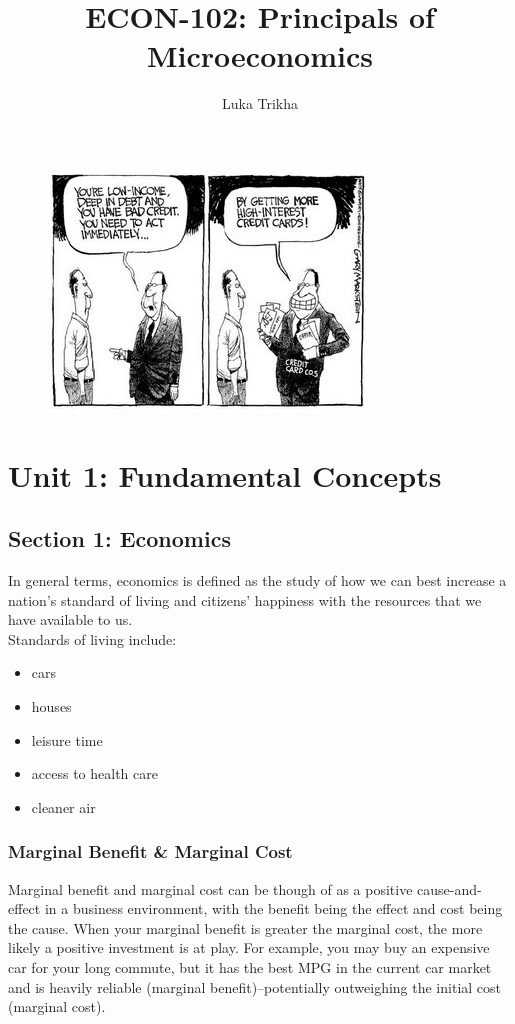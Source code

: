\documentclass[a4paper, 12pt] {article}
\begin{document}
\title{ECON-102: Principals of Microeconomics}
\author{Luka Trikha}
\maketitle

\begin{figure}[h]
    \centering
    \includegraphics{cartoon.jpg}
\end{figure}

\newpage
\tableofcontents
\newpage

\section{Unit 1: Fundamental Concepts}
\subsection{Section 1: Economics}
In general terms, economics is defined as the study of how we can best increase
a nation's standard of living and citizens' happiness with the resources that we
have available to us.\\[2mm]
Standards of living include:
\begin{itemize}
    \item cars
    \item houses
    \item leisure time
    \item access to health care
    \item cleaner air
\end{itemize}

\subsubsection{Marginal Benefit \& Marginal Cost}
Marginal benefit and marginal cost can be though of as a positive cause-and-effect
in a business environment, with the benefit being the effect and cost being the
cause. When your marginal benefit is greater the marginal cost, the more likely
a positive investment is at play. For example, you may buy an expensive car for
your long commute, but it has the best MPG in the current car market and is 
heavily reliable (marginal benefit)--potentially outweighing the initial cost
(marginal cost).
\end{document}

